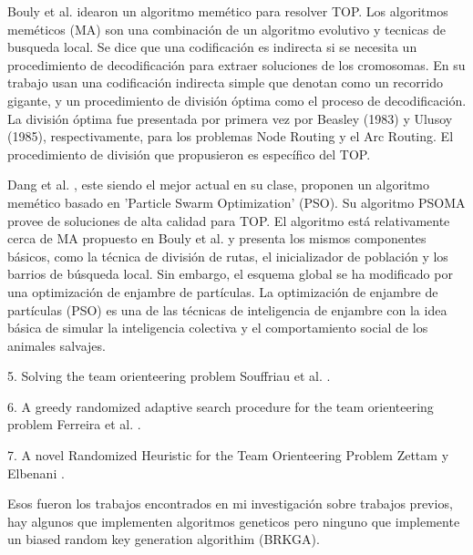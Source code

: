 \bigskip

Bouly et al. \cite{BoulyDangMoukrim} idearon un algoritmo memético para resolver TOP. Los algoritmos meméticos (MA) son una combinación de un algoritmo evolutivo y tecnicas de busqueda local. Se dice que una codificación es indirecta si se necesita un procedimiento de decodificación para extraer soluciones de los cromosomas. En su trabajo usan una codificación indirecta simple que denotan como un recorrido gigante, y un procedimiento de división óptima como el proceso de decodificación. La división óptima fue presentada por primera vez por Beasley (1983) y Ulusoy (1985), respectivamente, para los problemas Node Routing y el Arc Routing. El procedimiento de división que propusieron es específico del TOP.

\bigskip

Dang et al. \cite{DangGuibadjMoukrim}, este siendo el mejor actual en su clase, proponen un algoritmo memético basado en 'Particle Swarm Optimization'
(PSO). Su algoritmo PSOMA provee de soluciones de alta calidad para TOP. El algoritmo está relativamente cerca de MA propuesto en Bouly et al. \cite{BoulyDangMoukrim} y presenta los mismos componentes básicos, como la técnica de división de rutas, el inicializador de población y los barrios de búsqueda local. Sin embargo, el esquema global se ha modificado por una optimización de enjambre de partículas. La optimización de enjambre de partículas (PSO) es una de las técnicas de inteligencia de enjambre con la idea básica de simular la inteligencia colectiva y el comportamiento social de los animales salvajes.

\bigskip

5.  
Solving the team orienteering problem Souffriau et al. \cite{SouffriauVansteenwegenBergheOudheusden}.

6.
A greedy randomized adaptive search procedure for the team orienteering problem Ferreira et al. \cite{FerreiraQuintasOliveiraPereiraDias}.

7.
A novel Randomized Heuristic for the Team Orienteering Problem Zettam y Elbenani \cite{ZettamElbenani}.


\bigskip

Esos fueron los trabajos encontrados en mi investigación sobre trabajos previos, hay algunos que implementen algoritmos geneticos pero ninguno que implemente un biased random key generation algorithim (BRKGA).









